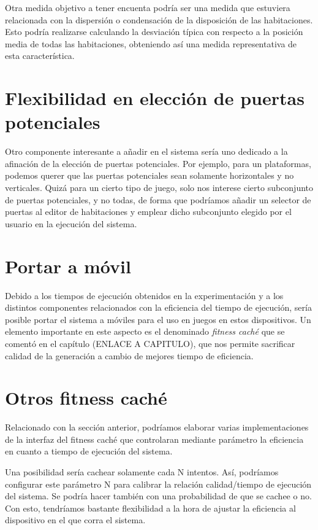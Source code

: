 Otra medida objetivo a tener encuenta podría ser una medida que estuviera relacionada con la dispersión o condensación de la disposición de las habitaciones. Esto podría realizarse calculando la desviación típica con respecto a la posición media de todas las habitaciones, obteniendo así una medida representativa de esta característica.

\section{Flexibilidad en elección de puertas potenciales}

Otro componente interesante a añadir en el sistema sería uno dedicado a la afinación de la elección de puertas potenciales. Por ejemplo, para un plataformas, podemos querer que las puertas potenciales sean solamente horizontales y no verticales. Quizá para un cierto tipo de juego, solo nos interese cierto subconjunto de puertas potenciales, y no todas, de forma que podríamos añadir un selector de puertas al editor de habitaciones y emplear dicho subconjunto elegido por el usuario en la ejecución del sistema.

\section{Portar a móvil}

Debido a los tiempos de ejecución obtenidos en la experimentación y a los distintos componentes relacionados con la eficiencia del tiempo de ejecución, sería posible portar el sistema a móviles para el uso en juegos en estos dispositivos. Un elemento importante en este aspecto es el denominado \emph{fitness caché} que se comentó en el capítulo (ENLACE A CAPITULO), que nos permite sacrificar calidad de la generación a cambio de mejores tiempo de eficiencia.

\section{Otros fitness caché}

Relacionado con la sección anterior, podríamos elaborar varias implementaciones de la interfaz del fitness caché que controlaran mediante parámetro la eficiencia en cuanto a tiempo de ejecución del sistema.

Una posibilidad sería cachear solamente cada N intentos. Así, podríamos configurar este parámetro N para calibrar la relación calidad/tiempo de ejecución del sistema. Se podría hacer también con una probabilidad de que se cachee o no. Con esto, tendríamos bastante flexibilidad a la hora de ajustar la eficiencia al dispositivo en el que corra el sistema.

